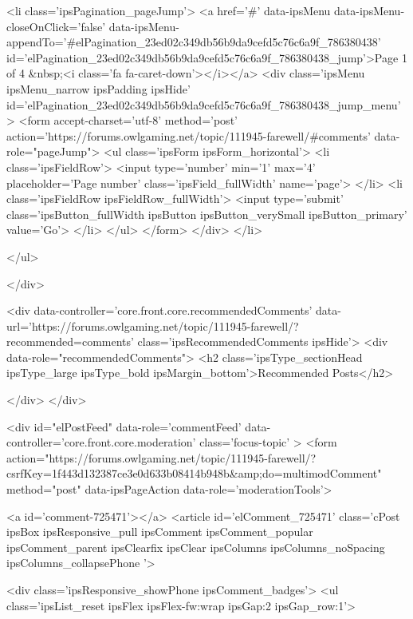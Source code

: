 			
				<li class='ipsPagination_pageJump'>
					<a href='#' data-ipsMenu data-ipsMenu-closeOnClick='false' data-ipsMenu-appendTo='#elPagination_23ed02c349db56b9da9cefd5c76c6a9f_786380438' id='elPagination_23ed02c349db56b9da9cefd5c76c6a9f_786380438_jump'>Page 1 of 4 &nbsp;<i class='fa fa-caret-down'></i></a>
					<div class='ipsMenu ipsMenu_narrow ipsPadding ipsHide' id='elPagination_23ed02c349db56b9da9cefd5c76c6a9f_786380438_jump_menu'>
						<form accept-charset='utf-8' method='post' action='https://forums.owlgaming.net/topic/111945-farewell/#comments' data-role="pageJump">
							<ul class='ipsForm ipsForm_horizontal'>
								<li class='ipsFieldRow'>
									<input type='number' min='1' max='4' placeholder='Page number' class='ipsField_fullWidth' name='page'>
								</li>
								<li class='ipsFieldRow ipsFieldRow_fullWidth'>
									<input type='submit' class='ipsButton_fullWidth ipsButton ipsButton_verySmall ipsButton_primary' value='Go'>
								</li>
							</ul>
						</form>
					</div>
				</li>
			
		
	</ul>

					
				</div>
			
	

	

<div data-controller='core.front.core.recommendedComments' data-url='https://forums.owlgaming.net/topic/111945-farewell/?recommended=comments' class='ipsRecommendedComments ipsHide'>
	<div data-role="recommendedComments">
		<h2 class='ipsType_sectionHead ipsType_large ipsType_bold ipsMargin_bottom'>Recommended Posts</h2>
		
	</div>
</div>
	
	<div id="elPostFeed" data-role='commentFeed' data-controller='core.front.core.moderation' class='focus-topic' >
		<form action="https://forums.owlgaming.net/topic/111945-farewell/?csrfKey=1f443d132387ce3e0d633b08414b948b&amp;do=multimodComment" method="post" data-ipsPageAction data-role='moderationTools'>
			
			
				
					
					
					



<a id='comment-725471'></a>
<article  id='elComment_725471' class='cPost ipsBox ipsResponsive_pull  ipsComment ipsComment_popular ipsComment_parent ipsClearfix ipsClear ipsColumns ipsColumns_noSpacing ipsColumns_collapsePhone    '>
	

	
		<div class='ipsResponsive_showPhone ipsComment_badges'>
			<ul class='ipsList_reset ipsFlex ipsFlex-fw:wrap ipsGap:2 ipsGap_row:1'>
				
